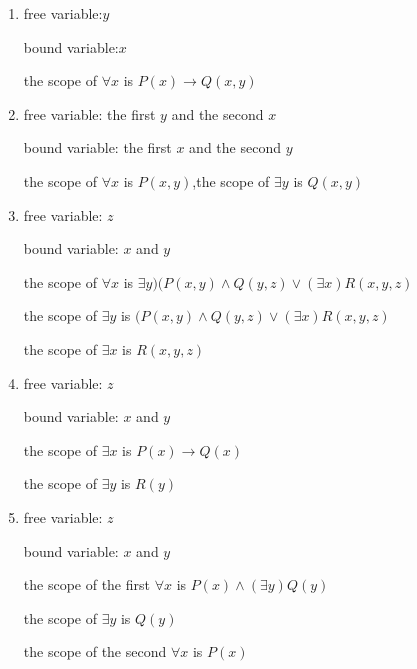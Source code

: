 \documentclass[10pt]{article}
\begin{document}
\begin{enumerate}
	\item
	free variable:$y$

	bound variable:$x$

	the scope of $\forall x$ is $P(x)\to Q(x,y)$

	\item
	free variable: the first $y$ and the second $x$

	bound variable: the first $x$ and the second $y$

	the scope of $\forall x$ is $P(x,y)$,the scope of $\exists y$ is $Q(x,y)$

	\item
	free variable: $z$

	bound variable: $x$ and $y$

	the scope of $\forall x$ is $\exists y)( P(x,y)\wedge Q(y,z)\vee (\exists x)R(x,y,z)$

	the scope of $\exists y$ is $( P(x,y)\wedge Q(y,z)\vee (\exists x)R(x,y,z)$

	the scope of $\exists x$ is $R(x,y,z)$

	\item
	free variable: $z$

	bound variable: $x$ and $y$

	the scope of $\exists x$ is $P(x)\to Q(x)$

	the scope of $\exists y$ is $R(y)$

	\item
	free variable: $z$

	bound variable: $x$ and $y$

	the scope of the first $\forall x$ is $ P(x)\wedge (\exists y)Q(y)$

	the scope of $\exists y$ is $Q(y)$

	the scope of the second $\forall x$ is $P(x)$

\end{enumerate}
\end{document}
